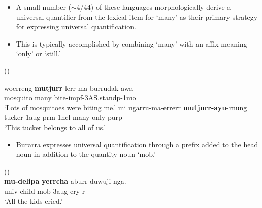 \documentclass{article}
\begin{document}
\begin{itemize}
\item A small number ($\sim$4/44) of these languages morphologically derive a universal quantifier from the lexical item for `many' as their primary strategy for expressing universal quantification.
\item This is typically accomplished by combining `many' with an affix meaning `only' or `still.'
\end{itemize}
\begin{exe}
   (\citealt[]{zandvoort99})
  \begin{xlist}
    \ex \gll woerreng \textbf{mutjurr} lerr-ma-burrudak-awa\\
    mosquito many bite-{\sc impf}-3AS.stand{\sc p}-1{\sc mo}\\
    \glt `Lots of mosquitoes were biting me.'%
    \ex \gll mi ngarru-ma-errerr \textbf{mutjurr-ayu}-rnung\\
    tucker 1{\sc aug-prm}-1{\sc ncl} many-only-{\sc purp}\\
    \glt `This tucker belongs to all of us.'%
  \end{xlist}
\end{exe}

\begin{itemize}
\item Burarra expresses universal quantification through a prefix added to the head noun in addition to the quantity noun `mob.'
\end{itemize}
\begin{exe}
   (\citealt[34]{green87}) \\
  \gll \textbf{mu-delipa}     \textbf{yerrcha}     aburr-duwuji-nga.\\
  {\sc univ}-child    mob        3{\sc aug}-cry-{\sc r}\\
  \glt `All the kids cried.'
\end{exe}
\end{document}
